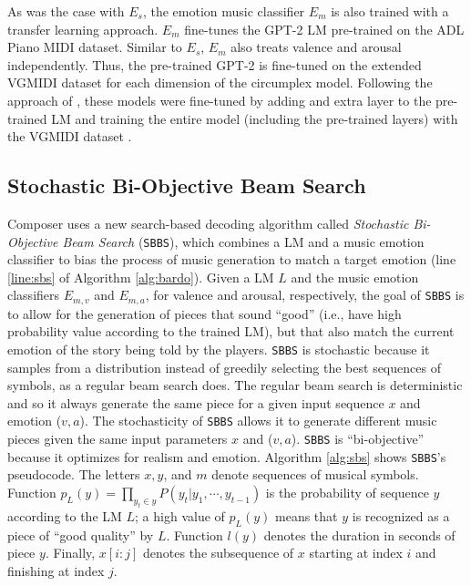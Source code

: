 As was the case with $E_s$, the emotion music classifier $E_m$ is also trained with a transfer learning approach. $E_m$ fine-tunes the GPT-2 LM pre-trained on the ADL Piano MIDI dataset. Similar to $E_s$, $E_m$ also treats valence and arousal independently. Thus, the pre-trained GPT-2 is fine-tuned on the extended VGMIDI dataset for each dimension of the circumplex model. Following the approach of \citet{Radford2018}, these models were fine-tuned by adding and extra layer to the pre-trained LM and training the entire model (including the pre-trained layers) with the VGMIDI dataset \cite{ferreira_2019}.

\subsection{Stochastic Bi-Objective Beam Search}

Composer uses a new search-based decoding algorithm called \textit{Stochastic Bi-Objective Beam Search} (\texttt{SBBS}), which combines a LM and a music emotion classifier to bias the process of music generation to match a target emotion (line \ref{line:sbs} of Algorithm \ref{alg:bardo}). Given a LM $L$ and the music emotion classifiers $E_{m, v}$ and $E_{m, a}$, for valence and arousal, respectively, the goal of \texttt{SBBS} is to allow for the generation of pieces that sound ``good'' (i.e., have high probability value according to the trained LM), but that also match the current emotion of the story being told by the players. \texttt{SBBS} is stochastic because it samples from a distribution instead of greedily selecting the best sequences of symbols, as a regular beam search does. The regular beam search is deterministic and so it always generate the same piece for a given input sequence $x$ and emotion ($v,a$). The stochasticity of \texttt{SBBS} allows it to generate different music pieces given the same input parameters $x$ and ($v, a$). \texttt{SBBS} is ``bi-objective'' because it optimizes for realism and emotion. Algorithm \ref{alg:sbs} shows \texttt{SBBS}'s pseudocode. The letters $x, y$, and $m$ denote sequences of musical symbols. Function $p_L(y) = \prod_{y_t \in y} P(y_t|y_1, \cdots, y_{t-1})$ is the probability of sequence $y$ according to the LM $L$; a high value of $p_L(y)$ means that $y$ is recognized as a piece of ``good quality'' by $L$. Function $l(y)$ denotes the duration in seconds of piece $y$. Finally, $x[i:j]$ denotes the subsequence of $x$ starting at index $i$ and finishing at index $j$.

